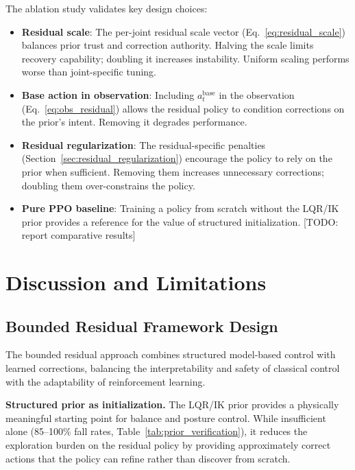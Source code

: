 \documentclass[conference]{IEEEtran}
\begin{document}
The ablation study validates key design choices:
\begin{itemize}
    \item \textbf{Residual scale}: The per-joint residual scale vector
    (Eq.~\eqref{eq:residual_scale}) balances prior trust and correction
    authority. Halving the scale limits recovery capability; doubling it
    increases instability. Uniform scaling performs worse than joint-specific
    tuning.

    \item \textbf{Base action in observation}: Including $a_t^{\mathrm{base}}$
    in the observation (Eq.~\eqref{eq:obs_residual}) allows the residual
    policy to condition corrections on the prior's intent. Removing it
    degrades performance.

    \item \textbf{Residual regularization}: The residual-specific penalties
    (Section~\ref{sec:residual_regularization}) encourage the policy to
    rely on the prior when sufficient. Removing them increases unnecessary
    corrections; doubling them over-constrains the policy.

    \item \textbf{Pure PPO baseline}: Training a policy from scratch without
    the LQR/IK prior provides a reference for the value of structured
    initialization. [TODO: report comparative results]
\end{itemize}

\section{Discussion and Limitations}
\label{sec:discussion}

\subsection{Bounded Residual Framework Design}

The bounded residual approach combines structured model-based control
with learned corrections, balancing the interpretability and safety of
classical control with the adaptability of reinforcement learning.

\noindent\textbf{Structured prior as initialization.}
The LQR/IK prior provides a physically meaningful starting point for
balance and posture control. While insufficient alone (85--100\% fall
rates, Table~\ref{tab:prior_verification}), it reduces the exploration
burden on the residual policy by providing approximately correct actions
that the policy can refine rather than discover from scratch.
\end{document}
